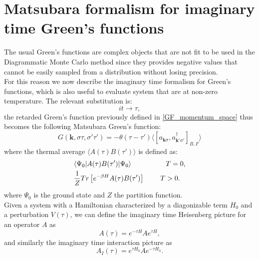 \documentclass[12pt, a4paper]{report}
\numberwithin{equation}{section}
\begin{document}
\section{Matsubara formalism for imaginary time Green's functions}
The usual Green's functions are complex objects that are not fit to be used in the Diagrammatic Monte Carlo method since they provides 
negative values that cannot be easily sampled from a distribution without losing precision.\\
For this reason we now describe the imaginary time formalism for Green's functions, which is also useful to evaluate system that are 
at non-zero temperature. The relevant substitution is:
\begin{equation}
    it\to \tau,
    \label{imaginary_time_substitution}
\end{equation}
the retarded Green's function previously defined in \ref{GF_momentum_space} thus becomes the following Matsubara Green's function:
\begin{equation}
    G(\mathbf{k},\sigma\tau,\sigma'\tau')=-\theta(\tau-\tau')\langle [a_{\mathbf{k}\sigma},a^\dagger_{\mathbf{k}'\sigma'}]_{B,F}\rangle
\end{equation}
where the thermal average $\langle A(\tau)B(\tau')\rangle$ is defined as:
\begin{equation}
\begin{split}
    &\langle \Psi_0|A(\tau)B(\tau')|\Psi_0\rangle\hspace{1.75cm}T=0,\\
    &\frac{1}{Z}Tr\left[e^{-\beta H}A(\tau)B(\tau')\right]\hspace{0.8cm}T>0.
\end{split}
\end{equation}
where $\Psi_0$ is the ground state and $Z$ the partition function.\\
Given a system with a Hamiltonian characterized by a diagonizable term $H_0$ and a perturbation $V(\tau)$, we can define the imaginary time 
Heisenberg picture for an operator $A$ as 
\begin{equation}
    A(\tau)=e^{-\tau H}Ae^{\tau H},
\end{equation}
and similarly the imaginary time interaction picture as
\begin{equation}
    A_I(\tau)=e^{\tau H_0}Ae^{-\tau H_0}.
\end{equation}
\end{document}
